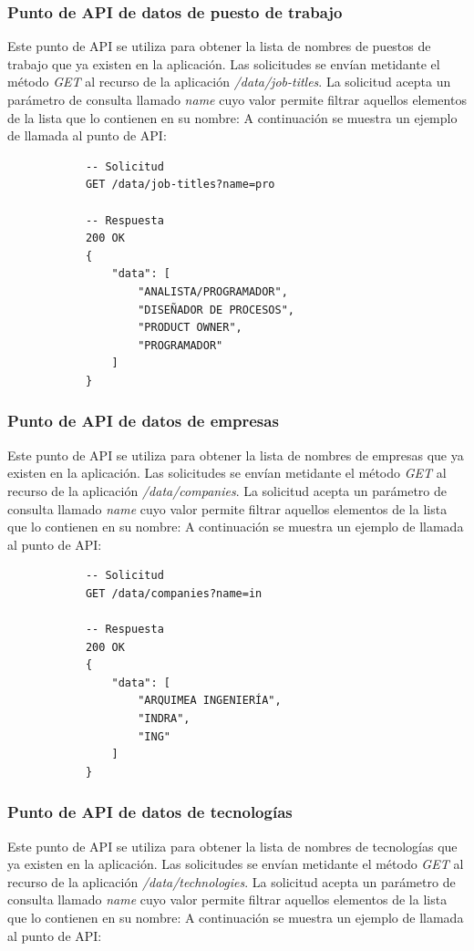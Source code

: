\documentclass[a4paper, 12pt]{book}
\begin{document}
    \subsubsection{Punto de API de datos de puesto de trabajo}
    \label{subsec:get_data_job_titles}
    Este punto de API se utiliza para obtener la lista de nombres de puestos de trabajo que ya existen en la aplicación.
    Las solicitudes se envían metidante el método \emph{GET} al recurso de la aplicación \emph{/data/job-titles}.
    La solicitud acepta un parámetro de consulta llamado \emph{name} cuyo valor permite filtrar aquellos elementos de la lista que lo contienen en su nombre:
    A continuación se muestra un ejemplo de llamada al punto de API:

        {\footnotesize
    \begin{verbatim}
			-- Solicitud
			GET /data/job-titles?name=pro

			-- Respuesta
			200 OK
			{
			    "data": [
			        "ANALISTA/PROGRAMADOR",
			        "DISEÑADOR DE PROCESOS",
			        "PRODUCT OWNER",
			        "PROGRAMADOR"
			    ]
			}
    \end{verbatim}
    }

    \subsubsection{Punto de API de datos de empresas}
    \label{subsec:get_data_companies}
    Este punto de API se utiliza para obtener la lista de nombres de empresas que ya existen en la aplicación.
    Las solicitudes se envían metidante el método \emph{GET} al recurso de la aplicación \emph{/data/companies}.
    La solicitud acepta un parámetro de consulta llamado \emph{name} cuyo valor permite filtrar aquellos elementos de la lista que lo contienen en su nombre:
    A continuación se muestra un ejemplo de llamada al punto de API:

        {\footnotesize
    \begin{verbatim}
			-- Solicitud
			GET /data/companies?name=in

			-- Respuesta
			200 OK
			{
			    "data": [
			        "ARQUIMEA INGENIERÍA",
			        "INDRA",
			        "ING"
			    ]
			}
    \end{verbatim}
    }

    \subsubsection{Punto de API de datos de tecnologías}
    \label{subsec:get_data_job_technologies}
    Este punto de API se utiliza para obtener la lista de nombres de tecnologías que ya existen en la aplicación.
    Las solicitudes se envían metidante el método \emph{GET} al recurso de la aplicación \emph{/data/technologies}.
    La solicitud acepta un parámetro de consulta llamado \emph{name} cuyo valor permite filtrar aquellos elementos de la lista que lo contienen en su nombre:
    A continuación se muestra un ejemplo de llamada al punto de API:
\end{document}

